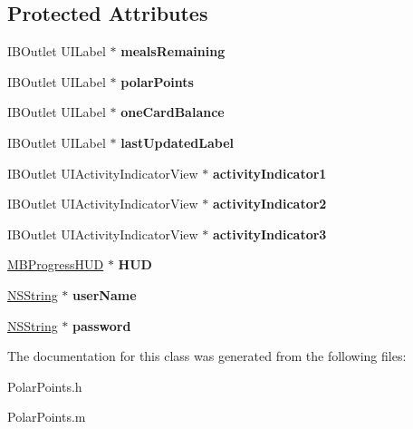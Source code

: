 \subsection*{Protected Attributes}
\begin{DoxyCompactItemize}
\item 
\hypertarget{interface_polar_points_abc1f649b4d9ed89f4438ae818045dc4b}{
IBOutlet UILabel $\ast$ {\bfseries mealsRemaining}}
\label{interface_polar_points_abc1f649b4d9ed89f4438ae818045dc4b}

\item 
\hypertarget{interface_polar_points_af442d60a1d93d69631831fe7bbfec8ae}{
IBOutlet UILabel $\ast$ {\bfseries polarPoints}}
\label{interface_polar_points_af442d60a1d93d69631831fe7bbfec8ae}

\item 
\hypertarget{interface_polar_points_aa3b09486da840c3234284dad35c8a1f9}{
IBOutlet UILabel $\ast$ {\bfseries oneCardBalance}}
\label{interface_polar_points_aa3b09486da840c3234284dad35c8a1f9}

\item 
\hypertarget{interface_polar_points_a3a28f5adce22e70993a4eee9222598d6}{
IBOutlet UILabel $\ast$ {\bfseries lastUpdatedLabel}}
\label{interface_polar_points_a3a28f5adce22e70993a4eee9222598d6}

\item 
\hypertarget{interface_polar_points_aa1e084f407cce70b243dcd78b9883928}{
IBOutlet UIActivityIndicatorView $\ast$ {\bfseries activityIndicator1}}
\label{interface_polar_points_aa1e084f407cce70b243dcd78b9883928}

\item 
\hypertarget{interface_polar_points_a5641cf7dc2d7d1c384ce9b0841edab66}{
IBOutlet UIActivityIndicatorView $\ast$ {\bfseries activityIndicator2}}
\label{interface_polar_points_a5641cf7dc2d7d1c384ce9b0841edab66}

\item 
\hypertarget{interface_polar_points_a83fa8068811d874663f0546c6a05530a}{
IBOutlet UIActivityIndicatorView $\ast$ {\bfseries activityIndicator3}}
\label{interface_polar_points_a83fa8068811d874663f0546c6a05530a}

\item 
\hypertarget{interface_polar_points_a6727fd56ec4c13b0b93edf6b434e1ed0}{
\hyperlink{interface_m_b_progress_h_u_d}{MBProgressHUD} $\ast$ {\bfseries HUD}}
\label{interface_polar_points_a6727fd56ec4c13b0b93edf6b434e1ed0}

\item 
\hypertarget{interface_polar_points_aaef81d62393463b29889bcf9164d271e}{
\hyperlink{class_n_s_string}{NSString} $\ast$ {\bfseries userName}}
\label{interface_polar_points_aaef81d62393463b29889bcf9164d271e}

\item 
\hypertarget{interface_polar_points_af67e5d1d53fac31fb146f8c363220809}{
\hyperlink{class_n_s_string}{NSString} $\ast$ {\bfseries password}}
\label{interface_polar_points_af67e5d1d53fac31fb146f8c363220809}

\end{DoxyCompactItemize}


The documentation for this class was generated from the following files:\begin{DoxyCompactItemize}
\item 
PolarPoints.h\item 
PolarPoints.m\end{DoxyCompactItemize}
